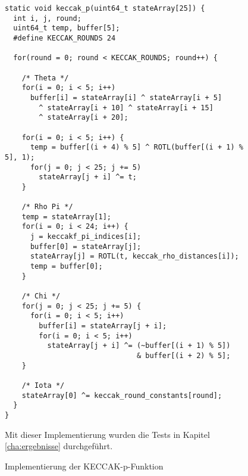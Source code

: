 \begin{figure}
\lstset{xleftmargin=2em}
\lstset{language=C}
\begin{lstlisting}[label={lst:keccak_impl}]
static void keccak_p(uint64_t stateArray[25]) {
  int i, j, round;
  uint64_t temp, buffer[5];
  #define KECCAK_ROUNDS 24

  for(round = 0; round < KECCAK_ROUNDS; round++) {

    /* Theta */
    for(i = 0; i < 5; i++)
      buffer[i] = stateArray[i] ^ stateArray[i + 5]
	    ^ stateArray[i + 10] ^ stateArray[i + 15]
        ^ stateArray[i + 20];

    for(i = 0; i < 5; i++) {
      temp = buffer[(i + 4) % 5] ^ ROTL(buffer[(i + 1) % 5], 1);
      for(j = 0; j < 25; j += 5)
        stateArray[j + i] ^= t;
    }

    /* Rho Pi */
    temp = stateArray[1];
    for(i = 0; i < 24; i++) {
      j = keccakf_pi_indices[i];
      buffer[0] = stateArray[j];
      stateArray[j] = ROTL(t, keccak_rho_distances[i]);
      temp = buffer[0];
    }

    /* Chi */
    for(j = 0; j < 25; j += 5) {
      for(i = 0; i < 5; i++)
        buffer[i] = stateArray[j + i];
        for(i = 0; i < 5; i++)
          stateArray[j + i] ^= (~buffer[(i + 1) % 5])
                               & buffer[(i + 2) % 5];
    }

    /* Iota */
    stateArray[0] ^= keccak_round_constants[round];
  }
}
\end{lstlisting}
\centering
\caption{Implementierung der KECCAK-p-Funktion}
\small Mit dieser Implementierung wurden die Tests in Kapitel \ref{cha:ergebnisse} durchgeführt.
\label{fig:keccak_impl}
\end{figure}

